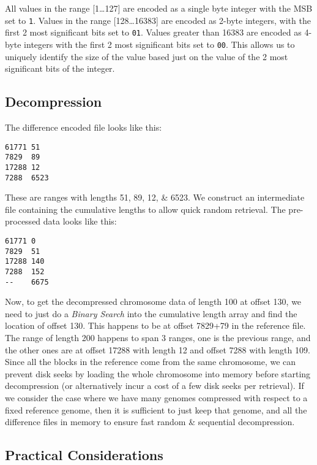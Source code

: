 \documentclass[11pt]{article}
\begin{document}
All values in the range [1\ldots{}127] are encoded as a single byte
integer with the MSB set to \texttt{1}. Values in the range
[128\ldots{}16383] are encoded as 2-byte integers, with the first 2
most significant bits set to \texttt{01}. Values greater than 16383
are encoded as 4-byte integers with the first 2 most significant bits
set to \texttt{00}. This allows us to uniquely identify the size of
the value based just on the value of the 2 most significant bits of
the integer.

\subsection{Decompression}

The difference encoded file looks like this:
\begin{verbatim}
61771 51
7829  89
17288 12
7288  6523
\end{verbatim}

These are ranges with lengths 51, 89, 12, \& 6523. We construct an
intermediate file containing the cumulative lengths to allow quick
random retrieval. The pre-processed data looks like this:

\begin{verbatim}
61771 0
7829  51
17288 140
7288  152
--    6675
\end{verbatim}

Now, to get the decompressed chromosome data of length 100 at offset
130, we need to just do a \textit{Binary Search} into the cumulative
length array and find the location of offset 130. This happens to be
at offset 7829+79 in the reference file. The range of length 200
happens to span 3 ranges, one is the previous range, and the other
ones are at offset 17288 with length 12 and offset 7288 with length
109. Since all the blocks in the reference come from the same
chromosome, we can prevent disk seeks by loading the whole chromosome
into memory before starting decompression (or alternatively incur a
cost of a few disk seeks per retrieval). If we consider the case where
we have many genomes compressed with respect to a fixed reference
genome, then it is sufficient to just keep that genome, and all the
difference files in memory to ensure fast random \& sequential
decompression.


\subsection{Practical Considerations}
\end{document}
